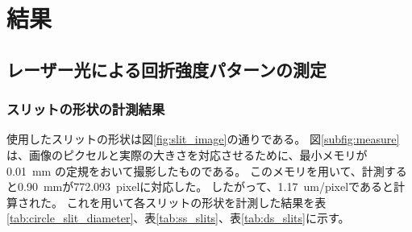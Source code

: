\documentclass[../../../main]{subfiles}
\begin{document}
\section{結果}


\subsection{レーザー光による回折強度パターンの測定}

\subsubsection{スリットの形状の計測結果}\label{subsubsec:slit_shape}
使用したスリットの形状は図\ref{fig:slit_image}の通りである。
図\ref{subfig:measure}は、画像のピクセルと実際の大きさを対応させるために、最小メモリが \SI{0.01}{mm} の定規をおいて撮影したものである。
このメモリを用いて、計測すると\SI{0.90}{mm}が\SI{772.093}{pixel}に対応した。
したがって、\SI{1.17}{um/pixel}であると計算された。
これを用いて各スリットの形状を計測した結果を表\ref{tab:circle_slit_diameter}、表\ref{tab:ss_slits}、表\ref{tab:ds_slits}に示す。



\end{document}
